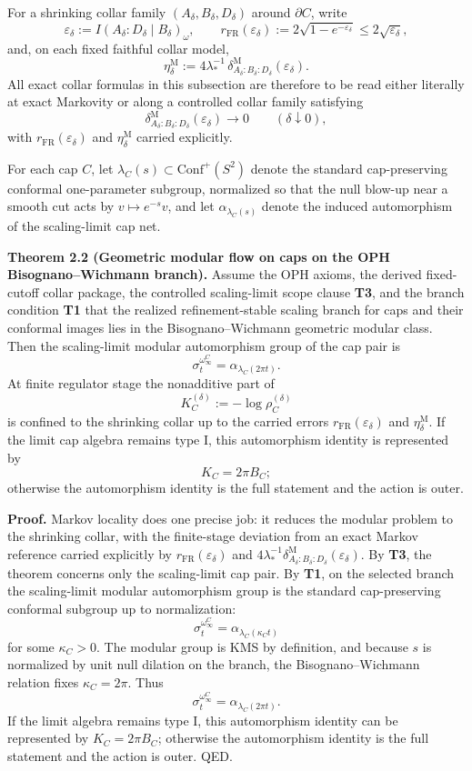 For a shrinking collar family \((A_\delta,B_\delta,D_\delta)\) around \(\partial C\), write
\[
\varepsilon_\delta:=I(A_\delta:D_\delta\mid B_\delta)_\omega,
\qquad
r_{\mathrm{FR}}(\varepsilon_\delta):=
2\sqrt{1-e^{-\varepsilon_\delta}}
\le 2\sqrt{\varepsilon_\delta},
\]
and, on each fixed faithful collar model,
\[
\eta_\delta^{\mathrm M}
:=
4\lambda_\ast^{-1}\,
\delta^{\mathrm M}_{A_\delta:B_\delta:D_\delta}(\varepsilon_\delta).
\]
All exact collar formulas in this subsection are therefore to be read either literally at exact Markovity or along a controlled collar family satisfying
\[
\delta^{\mathrm M}_{A_\delta:B_\delta:D_\delta}(\varepsilon_\delta)\to 0
\qquad(\delta\downarrow 0),
\]
with \(r_{\mathrm{FR}}(\varepsilon_\delta)\) and \(\eta_\delta^{\mathrm M}\) carried explicitly.

For each cap \(C\), let \(\lambda_C(s)\subset \mathrm{Conf}^+(S^2)\) denote the standard cap-preserving conformal one-parameter subgroup, normalized so that the null blow-up near a smooth cut acts by \(v\mapsto e^{-s}v\), and let \(\alpha_{\lambda_C(s)}\) denote the induced automorphism of the scaling-limit cap net.

\textbf{Theorem 2.2 (Geometric modular flow on caps on the OPH Bisognano--Wichmann branch).} Assume the OPH axioms, the derived fixed-cutoff collar package, the controlled scaling-limit scope clause \textbf{T3}, and the branch condition \textbf{T1} that the realized refinement-stable scaling branch for caps and their conformal images lies in the Bisognano--Wichmann geometric modular class. Then the scaling-limit modular automorphism group of the cap pair is
\[
\sigma_t^{\omega_\infty^C}
=
\alpha_{\lambda_C(2\pi t)}.
\]
At finite regulator stage the nonadditive part of
\[
K_C^{(\delta)}:=-\log \rho_C^{(\delta)}
\]
is confined to the shrinking collar up to the carried errors \(r_{\mathrm{FR}}(\varepsilon_\delta)\) and \(\eta_\delta^{\mathrm M}\). If the limit cap algebra remains type I, this automorphism identity is represented by
\[
K_C=2\pi B_C;
\]
otherwise the automorphism identity is the full statement and the action is outer.

\textbf{Proof.} Markov locality does one precise job: it reduces the modular problem to the shrinking collar, with the finite-stage deviation from an exact Markov reference carried explicitly by \(r_{\mathrm{FR}}(\varepsilon_\delta)\) and \(4\lambda_\ast^{-1}\delta^{\mathrm M}_{A_\delta:B_\delta:D_\delta}(\varepsilon_\delta)\). By \textbf{T3}, the theorem concerns only the scaling-limit cap pair. By \textbf{T1}, on the selected branch the scaling-limit modular automorphism group is the standard cap-preserving conformal subgroup up to normalization:
\[
\sigma_t^{\omega_\infty^C}
=
\alpha_{\lambda_C(\kappa_C t)}
\]
for some \(\kappa_C>0\). The modular group is KMS by definition, and because \(s\) is normalized by unit null dilation on the branch, the Bisognano--Wichmann relation fixes \(\kappa_C=2\pi\). Thus
\[
\sigma_t^{\omega_\infty^C}
=
\alpha_{\lambda_C(2\pi t)}.
\]
If the limit algebra remains type I, this automorphism identity can be represented by \(K_C=2\pi B_C\); otherwise the automorphism identity is the full statement and the action is outer. QED.

